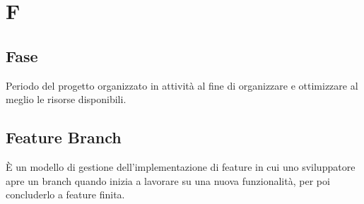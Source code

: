 \section{F}
	\subsection{Fase}
		Periodo del progetto organizzato in attività al fine di organizzare e ottimizzare al meglio le risorse disponibili. 
	\subsection{Feature Branch}
		È un modello di gestione dell'implementazione di  feature in cui uno sviluppatore apre un branch quando inizia a lavorare su una nuova funzionalità, per poi concluderlo a feature finita.
\newpage